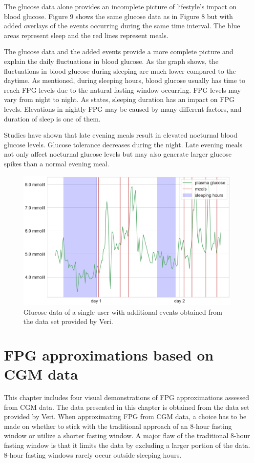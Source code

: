 \documentclass[english, 12pt, a4paper, elec, utf8, a-1b, online]{aaltothesis}
\begin{document}
The glucose data alone provides an incomplete picture of lifestyle's impact on blood glucose. Figure 9 shows the same glucose 
data as in Figure 8 but with added overlays of the events occurring during the same time interval. The blue areas represent sleep and the 
red lines represent meals. 

The glucose data and the added events provide a more complete picture and explain the daily fluctuations in blood glucose. As the graph shows, 
the fluctuations in blood glucose during sleeping are much lower compared to the daytime. As mentioned, during sleeping 
hours, blood glucose usually has time to reach FPG levels due to the natural fasting window occurring. FPG levels may vary from night to night. As \cite{nakajima_association_2008} states, sleeping duration has an impact on FPG levels. Elevations in nightly FPG
may be caused by many different factors, and duration of sleep is one of them. 

Studies have shown that late evening meals result in elevated nocturnal blood glucose levels\cite{sato_acute_2011}. Glucose tolerance decreases during
the night. Late evening meals not only affect nocturnal glucose levels but may also generate larger glucose spikes than a normal evening meal\cite{sato_acute_2011}.

\begin{figure}[H]
\centering
\includegraphics[width=14cm]{user_glucose_and_events.png}
\caption{Glucose data of a single user with additional events obtained from the data set provided by Veri.}
\end{figure}

\section{FPG approximations based on CGM data}
This chapter includes four visual demonstrations of FPG approximations assessed from CGM data.
The data presented in this chapter is obtained from the data set provided by Veri.
When approximating FPG from CGM data, a choice has to be made on whether to stick
with the traditional approach of an 8-hour fasting window\cite{mathew_blood_2022} or utilize a shorter fasting window\cite{moebus_impact_2011}.
A major flaw of the traditional 8-hour fasting window is that it limits the data by excluding a larger portion of the data. 8-hour fasting windows rarely occur outside
sleeping hours.
\end{document}
